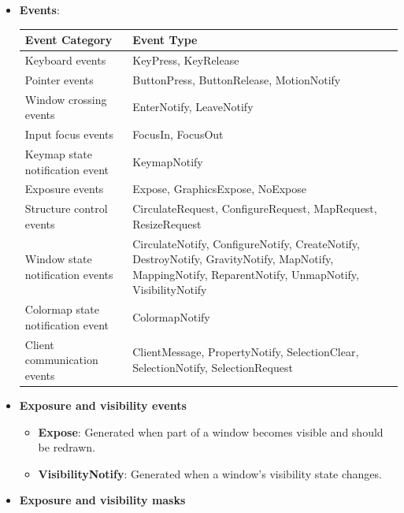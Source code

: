 \documentclass{report}
\begin{document}
    \pagebreak 
    \begin{itemize}
        \item \textbf{Events}: 
            \begin{center}
                \begin{tabularx}{\textwidth}{@{}XX@{}}
                    \toprule
                    \textbf{Event Category}& \textbf{Event Type} \\
                    \midrule
                    Keyboard events &KeyPress, KeyRelease\\[2ex]
                    Pointer events &ButtonPress, ButtonRelease, MotionNotify\\[2ex]
                    Window crossing events &EnterNotify, LeaveNotify\\[2ex]
                    Input focus events &FocusIn, FocusOut\\[2ex]
                    Keymap state notification event &KeymapNotify\\[2ex]
                    Exposure events &Expose, GraphicsExpose, NoExpose\\[2ex]
                    Structure control events &CirculateRequest, ConfigureRequest, MapRequest, ResizeRequest \\[2ex]
                    Window state notification events &CirculateNotify, ConfigureNotify, CreateNotify, DestroyNotify, GravityNotify, MapNotify, MappingNotify, ReparentNotify, UnmapNotify, VisibilityNotify\\[2ex]
                    Colormap state notification event& ColormapNotify\\[2ex]
                    Client communication events &ClientMessage, PropertyNotify, SelectionClear, SelectionNotify, SelectionRequest  \\
                    \bottomrule
                \end{tabularx}
            \end{center}
        \item \textbf{Exposure and visibility events}
            \bigbreak \noindent
            \begin{itemize}
                \item \textbf{Expose}: Generated when part of a window becomes visible and should be redrawn.
                \item \textbf{VisibilityNotify}: Generated when a window's visibility state changes.
            \end{itemize}
        \item \textbf{Exposure and visibility masks}

\end{itemize}
\end{document}

